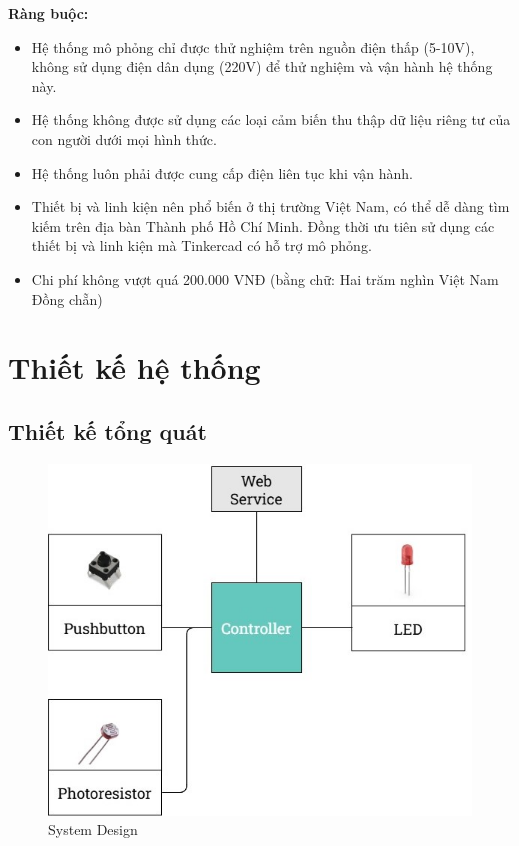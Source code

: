 \textbf{Ràng buộc:} 
\begin{itemize}
    \item Hệ thống mô phỏng chỉ được thử nghiệm trên nguồn điện thấp (5-10V), không sử dụng điện dân dụng (220V) để thử nghiệm và vận hành hệ thống này.
    \item Hệ thống không được sử dụng các loại cảm biến thu thập dữ liệu riêng tư của con người dưới mọi hình thức.
    \item Hệ thống luôn phải được cung cấp điện liên tục khi vận hành.
    \item Thiết bị và linh kiện nên phổ biến ở thị trường Việt Nam, có thể dễ dàng tìm kiếm trên địa bàn Thành phố Hồ Chí Minh. Đồng thời ưu tiên sử dụng các thiết bị và linh kiện mà Tinkercad có hỗ trợ mô phỏng.
    \item Chi phí không vượt quá 200.000 VNĐ (bằng chữ: Hai trăm nghìn Việt Nam Đồng chẵn)
\end{itemize}

\section{Thiết kế hệ thống}
\subsection{Thiết kế tổng quát}
\begin{figure}[H]
    \centering
    \includegraphics[scale=0.7]{img/SystemDesign.jpg}
    \caption{System Design}
    \label{fig:my_label}
\end{figure}

